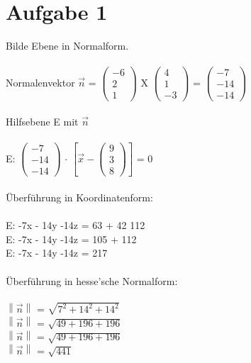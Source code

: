 \documentclass{article}
\begin{document}
	\section*{Aufgabe 1}
	Bilde Ebene in Normalform. \\
	\\
	Normalenvektor $\vec{n}$ = 
	$\left(\begin{array}{c}
	-6 \\ 2 \\ 1
	\end{array}\right)$
	X
	$\left(\begin{array}{c}
	4 \\1 \\ -3
	\end{array}\right)$ = 
	$\left(\begin{array}{c}
	-7 \\ -14 \\ -14
	\end{array}\right)$
	\\  \\
	Hilfsebene E mit $\vec{n}$ \\ \\
	E: 
	$\left(\begin{array}{c}
	-7 \\ -14 \\ -14
	\end{array}\right)$
	 $\cdot$ $\left[\vec{x} - 
	\left(\begin{array}{c}
	9 \\ 3 \\ 8
	\end{array}\right)
	\right]$
	= 0 \\
	\\
	Überführung in Koordinatenform: \\
	\\
	E: -7x - 14y -14z = 63 + 42 112 \\
	E: -7x - 14y -14z = 105 + 112 \\
	E: -7x - 14y -14z = 217 \\ \\
	Überführung in hesse'sche Normalform: \\ \\
	$\left\|\vec{n}\right\|$ = $\sqrt{7^2 +14^2 +14^2}$ \\
	$\left\|\vec{n}\right\|$ = $\sqrt{49 + 196 + 196}$ \\
	$\left\|\vec{n}\right\|$ = $\sqrt{49 + 196 + 196}$ \\
	$\left\|\vec{n}\right\|$ = $\sqrt{441}$ \\
\end{document}
